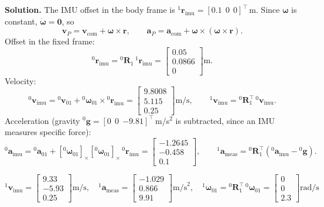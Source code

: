 \documentclass[11pt]{article}
\newcommand{\R}{\bm{R}}
\newcommand{\wvec}{\bm{\omega}}
\newcommand{\vvec}{\bm{v}}
\newcommand{\skewx}[1]{\left[#1\right]_{\times}}
\begin{document}
\textbf{Solution.} The IMU offset in the body frame is ${}^1\bm{r}_{\mathrm{imu}}=[0.1\ \ 0\ \ 0]^{\intercal}$\,m. Since $\wvec$ is constant, $\dot{\wvec}=\bm{0}$, so
\[
\vvec_P=\vvec_{\mathrm{com}}+\wvec\times\bm{r},\qquad
\bm{a}_P=\bm{a}_{\mathrm{com}}+\wvec\times(\wvec\times\bm{r}).
\]
Offset in the fixed frame:
\[
{}^0\bm{r}_{\mathrm{imu}}={}^0\R_1\,{}^1\bm{r}_{\mathrm{imu}}=\begin{bmatrix}0.05\\0.0866\\0\end{bmatrix}\mathrm{m}.
\]
Velocity:
\[
{}^0\vvec_{\mathrm{imu}}={}^0\vvec_{01}+{}^0\wvec_{01}\times{}^0\bm{r}_{\mathrm{imu}}=\begin{bmatrix}9.8008\\5.115\\0.25\end{bmatrix}\mathrm{m/s},\qquad
{}^1\vvec_{\mathrm{imu}}={}^0\R_1^{\intercal}\,{}^0\vvec_{\mathrm{imu}}.
\]
Acceleration (gravity ${}^0\bm{g}=[0\ \ 0\ \ {-9.81}]^{\intercal}$\,m/s$^2$ is subtracted, since an IMU measures specific force):
\[
{}^0\bm{a}_{\mathrm{imu}}={}^0\bm{a}_{01}+\skewx{{}^0\wvec_{01}}\skewx{{}^0\wvec_{01}}\,{}^0\bm{r}_{\mathrm{imu}}=\begin{bmatrix}-1.2645\\-0.458\\0.1\end{bmatrix},\qquad
{}^1\bm{a}_{\mathrm{meas}}={}^0\R_1^{\intercal}\left({}^0\bm{a}_{\mathrm{imu}}-{}^0\bm{g}\right).
\]
\begin{result}
\[
{}^1\vvec_{\mathrm{imu}}=\begin{bmatrix}9.33\\-5.93\\0.25\end{bmatrix}\mathrm{m/s},\quad
{}^1\bm{a}_{\mathrm{meas}}=\begin{bmatrix}-1.029\\0.866\\9.91\end{bmatrix}\mathrm{m/s}^2,\quad
{}^1\wvec_{01}={}^0\R_1^{\intercal}\,{}^0\wvec_{01}=\begin{bmatrix}0\\0\\2.3\end{bmatrix}\mathrm{rad/s}
\]
\end{result}
\end{document}
